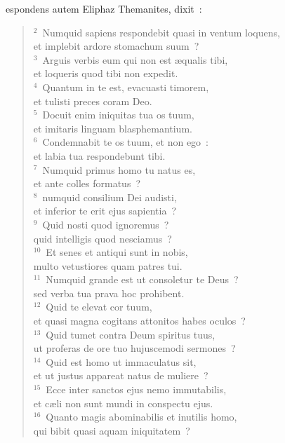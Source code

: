 \bchapter
{}espondens autem Eliphaz Themanites, dixit~:
\begin{flushleft}\begin{verse}\vspace{6pt}${}^{2}$~Numquid sapiens respondebit quasi in ventum loquens,\\ et implebit ardore stomachum suum~?\\
${}^{3}$~Arguis verbis eum qui non est \ae qualis tibi,\\ et loqueris quod tibi non expedit.\\
${}^{4}$~Quantum in te est, evacuasti timorem,\\ et tulisti preces coram Deo.\\
${}^{5}$~Docuit enim iniquitas tua os tuum,\\ et imitaris linguam blasphemantium.\\
${}^{6}$~Condemnabit te os tuum, et non ego~:\\ et labia tua respondebunt tibi.\\
${}^{7}$~Numquid primus homo tu natus es,\\ et ante colles formatus~?\\
${}^{8}$~numquid consilium Dei audisti,\\ et inferior te erit ejus sapientia~?\\
${}^{9}$~Quid nosti quod ignoremus~?\\ quid intelligis quod nesciamus~?\\
${}^{10}$~Et senes et antiqui sunt in nobis,\\ multo vetustiores quam patres tui.\\
${}^{11}$~Numquid grande est ut consoletur te Deus~?\\ sed verba tua prava hoc prohibent.\\
${}^{12}$~Quid te elevat cor tuum,\\ et quasi magna cogitans attonitos habes oculos~?\\
${}^{13}$~Quid tumet contra Deum spiritus tuus,\\ ut proferas de ore tuo hujuscemodi sermones~?\\
${}^{14}$~Quid est homo ut immaculatus sit,\\ et ut justus appareat natus de muliere~?\\
${}^{15}$~Ecce inter sanctos ejus nemo immutabilis,\\ et c\ae li non sunt mundi in conspectu ejus.\\
${}^{16}$~Quanto magis abominabilis et inutilis homo,\\ qui bibit quasi aquam iniquitatem~?\\

\end{verse}
\end{flushleft}
